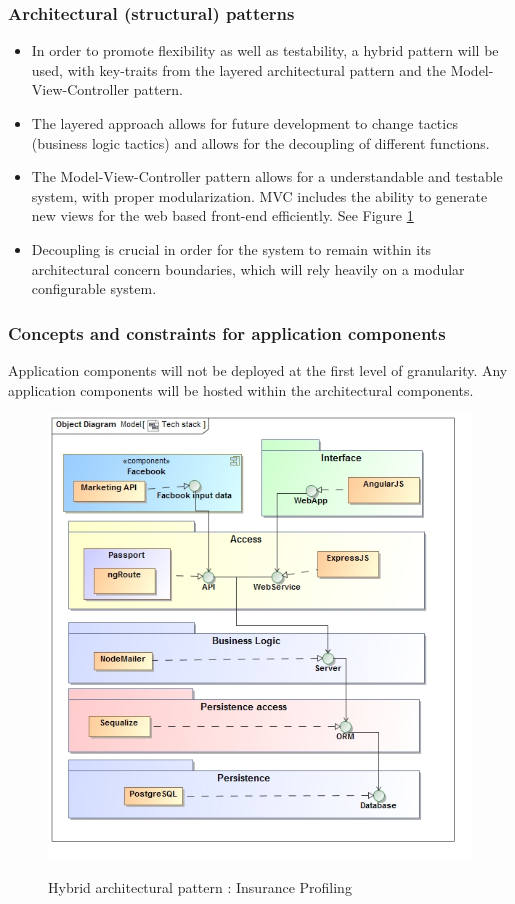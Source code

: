\documentclass{article}
\begin{document}
	\subsubsection{Architectural (structural) patterns}
	\begin{itemize}
	
	
	\item In order to promote flexibility as well as testability, a hybrid pattern will be used, with key-traits from the  layered architectural pattern and the Model-View-Controller pattern.
	\item The layered approach allows for future development to change tactics (business logic tactics) and allows for the decoupling of different functions. 
	\item The Model-View-Controller pattern allows for a understandable and testable system, with proper modularization.
	MVC includes the ability to generate new views for the web based front-end efficiently. See Figure \ref{fig:techstack}
	\item Decoupling is crucial in order for the system to remain within its architectural concern boundaries, which will rely heavily on a modular configurable system.  
	\end{itemize}
	\subsubsection{Concepts and constraints for application components}
	Application components will not be deployed at the first level of granularity. Any application components will be hosted within the architectural components.
	\begin{figure}[H]
		\includegraphics[width=\textwidth]{images/obj__Tech_stack.jpg}  \\
		\caption{Hybrid architectural pattern : Insurance Profiling}
		\label{fig:techstack}
	\end{figure}
\end{document}
